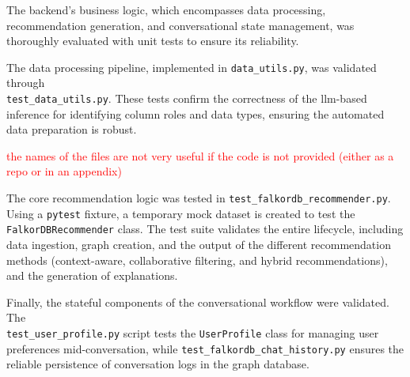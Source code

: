The backend's business logic, which encompasses data processing, recommendation generation, and conversational state management, was thoroughly evaluated with unit tests to ensure its reliability.

The data processing pipeline, implemented in \texttt{data\_utils.py}, was validated through \\ \texttt{test\_data\_utils.py}. These tests confirm the correctness of the \acs{llm}-based inference for identifying column roles and data types, ensuring the automated data preparation is robust.

\textcolor{red}{the names of the files are not very useful if the code is not provided (either as a repo or in an appendix)}

The core recommendation logic was tested in \texttt{test\_falkordb\_recommender.py}. Using a \texttt{pytest} fixture, a temporary mock dataset is created to test the \texttt{FalkorDBRecommender} class. The test suite validates the entire lifecycle, including data ingestion, graph creation, and the output of the different recommendation methods (context-aware, collaborative filtering, and hybrid recommendations), and the generation of explanations.

Finally, the stateful components of the conversational workflow were validated. The \\ \texttt{test\_user\_profile.py} script tests the \texttt{UserProfile} class for managing user preferences mid-conversation, while \texttt{test\_falkordb\_chat\_history.py} ensures the reliable persistence of conversation logs in the graph database.